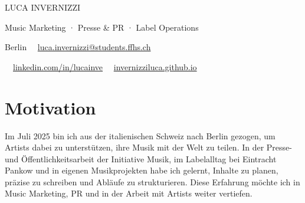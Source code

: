 \documentclass[10pt,a4paper]{article}
\newif\ifshowphone
\newcommand{\phone}{+41 78 945 80 35}
\newif\ifshowcitizenship
\newcommand{\semibold}{\fontseries{sb}\selectfont}
\begin{document}
\small\raggedright

{\displayfont\fontsize{23}{26}\selectfont LUCA INVERNIZZI}\par\vspace{4pt}
{\semibold\fontsize{10}{12}\selectfont\color{accent} Music Marketing · Presse \& PR · Label Operations}\par\vspace{5pt}
{\footnotesize\color{ink2}
Berlin\ifshowcitizenship\ \textbar\ Schweizer Staatsbürger\fi
\ \textbar\ \href{mailto:luca.invernizzi@students.ffhs.ch}{luca.invernizzi@students.ffhs.ch}
\ifshowphone\ \textbar\ \phone\fi
\ \textbar\ \href{https://www.linkedin.com/in/lucainve/}{linkedin.com/in/lucainve}
\ \textbar\ \href{https://invernizziluca.github.io}{invernizziluca.github.io}}

\section*{Motivation}
Im Juli 2025 bin ich aus der italienischen Schweiz nach Berlin gezogen, um Artists dabei zu unterstützen, ihre Musik mit der Welt zu teilen.
In der Presse- und Öffentlichkeitsarbeit der Initiative Musik, im Labelalltag bei Eintracht Pankow und in eigenen Musikprojekten habe ich gelernt, Inhalte zu planen, präzise zu schreiben und Abläufe zu strukturieren.
Diese Erfahrung möchte ich in Music Marketing, PR und in der Arbeit mit Artists weiter vertiefen.
\end{document}
